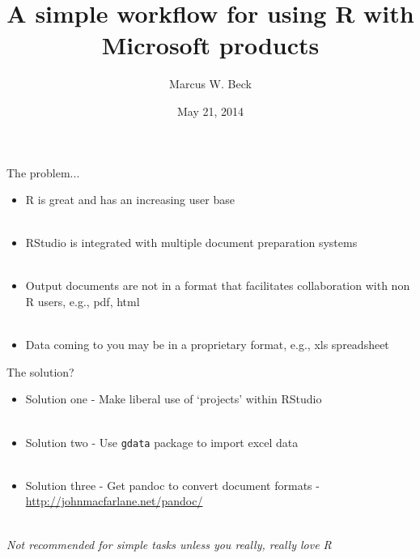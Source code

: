 \documentclass[xcolor=svgnames]{beamer}\usepackage[]{graphicx}\usepackage[]{color}
\begin{document}
\title[R with Microsoft]{A simple workflow for using R with Microsoft products}
\author[M. Beck]{Marcus W. Beck}


\date{May 21, 2014}

\begin{frame}
\vspace{-0.3in}
\titlepage
\end{frame}

\begin{frame}{The problem...}
\begin{itemize}
\item R is great and has an increasing user base\\~\\
\item RStudio is integrated with multiple document preparation systems \\~\\
\item Output documents are not in a format that facilitates collaboration with 
non R users, e.g., pdf, html \\~\\
\item Data coming to you may be in a proprietary format, e.g., xls spreadsheet
\end{itemize}
\end{frame}

\begin{frame}{The solution?}
\begin{itemize}
\item Solution one - Make liberal use of `projects' within RStudio \\~\\
\item Solution two - Use \texttt{gdata} package to import excel data \\~\\
\item Solution three - Get pandoc to convert document formats - \href{http://johnmacfarlane.net/pandoc/}{http://johnmacfarlane.net/pandoc/} \\~\\
\end{itemize}
\large
\centerline{\textit{Not recommended for simple tasks unless you really, really love R}}
\end{frame}
\end{document}
